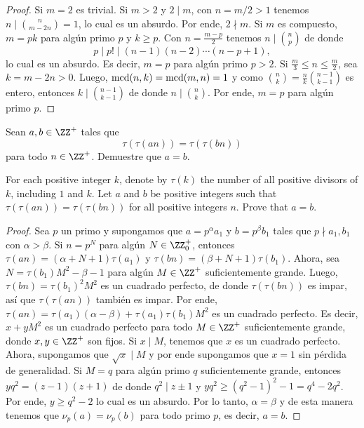 \begin{proof}
  Si $m=2$ es trivial. Si $m>2$ y $2\mid m$, con $n=m/2>1$ tenemos
  $n\mid\binom{n}{m-2n}=1$, lo cual es un absurdo. Por ende, $2\nmid m$. Si $m$
  es compuesto, $m=pk$ para algún primo $p$ y $k\ge p$. Con $n=\frac{m-p}{2}$
  tenemos $n\mid\binom np$ de donde
  \[p\mid p!\mid(n-1)(n-2)\cdots(n-p+1),\]
  lo cual es un absurdo. Es decir, $m=p$ para algún primo $p>2$. Si
  $\frac m3\le n\le\frac m2$, sea $k=m-2n>0$. Luego, $\operatorname{mcd}(n,k)=\operatorname{mcd}(m,n)=1$ y
  como $\binom nk=\frac nk\binom{n-1}{k-1}$ es entero, entonces
  $k\mid\binom{n-1}{k-1}$ de donde $n\mid\binom nk$. Por ende, $m=p$ para algún
  primo $p$.
\end{proof}

\begin{probMG}
  Sean $a,b\in\ZZ^+$ tales que
  \[\tau(\tau(an))=\tau(\tau(bn))\]
  para todo $n\in\ZZ^+$. Demuestre que $a=b$.
  \begin{hint}
    For each positive integer $k$, denote by $\tau(k)$ the number of all
    positive divisors of $k$, including $1$ and $k$. Let $a$ and $b$ be positive
    integers such that $\tau(\tau(an))=\tau(\tau(bn))$ for all positive integers
    $n$. Prove that $a=b$.
  \end{hint}
\end{probMG}

\begin{proof}
  Sea $p$ un primo y supongamos que $a=p^\alpha a_1$ y $b=p^\beta b_1$ tales que
  $p\nmid a_1,b_1$ con $\alpha>\beta$. Si $n=p^N$ para algún $N\in\ZZ^+_0$,
  entonces $\tau(an)=(\alpha+N+1)\tau(a_1)$ y $\tau(bn)=(\beta+N+1)\tau(b_1)$.
  Ahora, sea $N=\tau(b_1)M^2-\beta-1$ para algún $M\in\ZZ^+$ suficientemente
  grande. Luego, $\tau(bn)=\tau(b_1)^2M^2$ es un cuadrado perfecto, de donde
  $\tau(\tau(bn))$ es impar, así que $\tau(\tau(an))$ también es impar. Por
  ende, $\tau(an)=\tau(a_1)(\alpha-\beta)+\tau(a_1)\tau(b_1)M^2$ es un cuadrado
  perfecto. Es decir, $x+yM^2$ es un cuadrado perfecto para todo $M\in\ZZ^+$
  suficientemente grande, donde $x,y\in\ZZ^+$ son fijos. Si $x\mid M$, tenemos
  que $x$ es un cuadrado perfecto. Ahora, supongamos que $\sqrt{x}\mid M$ y por
  ende supongamos que $x=1$ sin pérdida de generalidad. Si $M=q$ para algún
  primo $q$ suficientemente grande, entonces $yq^2=(z-1)(z+1)$ de donde
  $q^2\mid z\pm 1$ y $yq^2\ge(q^2-1)^2-1=q^4-2q^2$. Por ende, $y\ge q^2-2$ lo
  cual es un absurdo. Por lo tanto, $\alpha=\beta$ y de esta manera tenemos que
  $\nu_p(a)=\nu_p(b)$ para todo primo $p$, es decir, $a=b$.
\end{proof}

